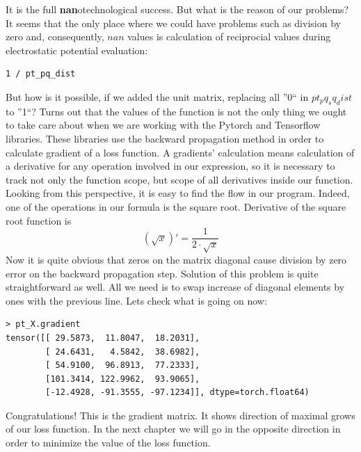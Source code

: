 \documentclass[12pt]{extarticle}
\begin{document}
It is the full \textbf{nan}otechnological success.
%
But what is the reason of our problems?
%
It seems that the only place where we could have problems such as division by zero and, consequently, \(nan\) values is calculation of reciprocial
values during electrostatic potential evaluation:
\begin{lstlisting}[frame=single]
1 / pt_pq_dist
\end{lstlisting}
%
But how is it possible, if we added the unit matrix, replacing all
''0`` in \(pt_pq_sq_dist\) to ''1``?
%
Turns out that the values of the function is not the only
thing we ought to take care about when we are working
with the Pytorch and Tensorflow libraries.
%
These libraries use the backward propagation method in order
to calculate gradient of a loss function.
%
A gradients' calculation means calculation of a derivative
for any operation involved in our expression, so it is
necessary to track not only the function scope, but
scope of all derivatives inside our function.
%
Looking from this perspective, it is easy to find
the flow in our program.
%
Indeed, one of the operations in our formula is
the square root.
%
Derivative of the square root function is
\begin{equation}
 \left ( \sqrt x \right )' = \frac 1 {2\cdot \sqrt x}
\end{equation}
%
Now it is quite obvious that zeros on the matrix diagonal
cause division by zero error on the backward propagation step.
%
Solution of this problem is quite straightforward as well.
%
All we need is to swap increase of diagonal elements by ones
with the previous line.
%
Lets check what is going on now:
\begin{lstlisting}[frame=single]
 > pt_X.gradient
tensor([[ 29.5873,  11.8047,  18.2031],
        [ 24.6431,   4.5842,  38.6982],
        [ 54.9100,  96.8913,  77.2333],
        [101.3414, 122.9962,  93.9065],
        [-12.4928, -91.3555, -97.1234]], dtype=torch.float64)
\end{lstlisting}
%
Congratulations!
%
This is the gradient matrix. 
%
It shows direction of maximal grows of our loss function.
%
In the next chapter we will go in the opposite direction 
in order to minimize the value of the loss function.
\end{document}

